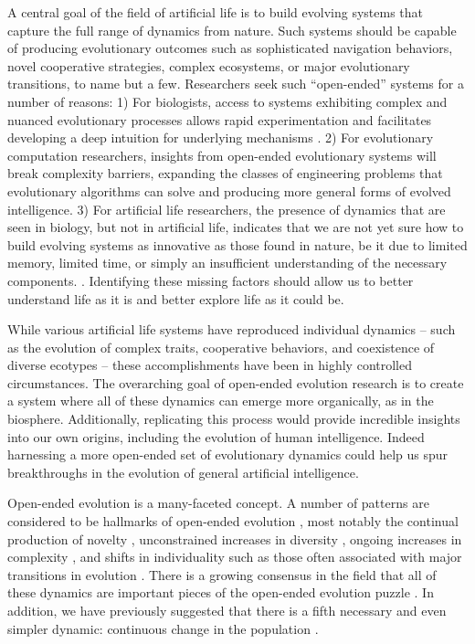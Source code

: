 \documentclass[letterpaper]{article}
\begin{document}
A central goal of the field of artificial life is to build evolving systems that capture the full range of dynamics from nature. Such systems should be capable of producing evolutionary outcomes such as sophisticated navigation behaviors, novel cooperative strategies, complex ecosystems, or major evolutionary transitions, to name but a few. Researchers seek such ``open-ended'' systems for a number of reasons:
1) For biologists, access to systems exhibiting complex and nuanced evolutionary processes allows rapid experimentation and facilitates developing a deep intuition for underlying mechanisms \citep{tenaillon_tempo_2016}.
2) For evolutionary computation researchers, insights from open-ended evolutionary systems will break complexity barriers, expanding the classes of engineering problems that evolutionary algorithms can solve \citep{Hara:1999vo, Potter:2000dw} and producing more general forms of evolved intelligence.
3) For artificial life researchers, the presence of dynamics that are seen in biology, but not in artificial life,
indicates that we are not yet sure how to build evolving systems as innovative as those found in nature, be it due to limited memory, limited time, or simply an insufficient understanding of the necessary components.
\citep{Korb:2011kg}.
Identifying these missing factors should allow us to better understand life as it is and better explore life as it could be.

While various artificial life systems have reproduced individual dynamics -- such as the evolution of complex traits, cooperative behaviors, and coexistence of diverse ecotypes \citep{Lenski:2003vy, Goldsby:2012tz, cooper_evolution_2003} -- these accomplishments have been in highly controlled circumstances. The overarching goal of open-ended evolution research is to create a system where all of these dynamics can emerge more organically, as in the biosphere. 
Additionally, replicating this process would provide incredible insights into our own origins, including the evolution of human intelligence.  Indeed harnessing a more open-ended set of evolutionary dynamics could help us spur breakthroughs in the evolution of general artificial intelligence.


Open-ended evolution is a many-faceted concept. A number of patterns are considered to be hallmarks of open-ended evolution \citep{taylor_open-ended_2016}, most notably the continual production of novelty \citep{lehman_abandoning_2011, banzhaf_defining_2016}, unconstrained increases in diversity \citep{bedau1994bifurcation}, ongoing increases in complexity \citep{Lenski:2003vy}, and shifts in individuality such as those often associated with major transitions in evolution \citep{smith1997major}. There is a growing consensus in the field that all of these dynamics are important pieces of the open-ended evolution puzzle \citep{taylor_open-ended_2016}. In addition, we have previously suggested that there is a fifth necessary and even simpler dynamic: continuous change in the population \citep{blogpost}.
\end{document}
